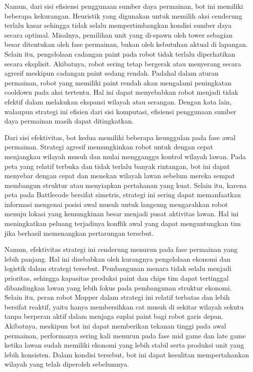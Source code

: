 \documentclass{article}
\begin{document}
Namun, dari sisi efisiensi penggunaan sumber daya permainan, bot ini memiliki beberapa kekurangan. 
Heuristik yang digunakan untuk memilih aksi cenderung terlalu kasar sehingga tidak selalu 
mempertimbangkan kondisi sumber daya secara optimal. Misalnya, pemilihan unit yang di-spawn oleh 
tower sebagian besar ditentukan oleh fase permainan, bukan oleh kebutuhan aktual di lapangan. Selain 
itu, pengelolaan cadangan paint pada robot tidak terlalu diperhatikan secara eksplisit. Akibatnya, robot 
sering tetap bergerak atau menyerang secara agresif meskipun cadangan paint sedang rendah. Padahal 
dalam aturan permainan, robot yang memiliki paint rendah akan mengalami peningkatan cooldown pada aksi tertentu. Hal ini dapat menyebabkan robot menjadi tidak efektif dalam melakukan ekspansi wilayah 
atau serangan. Dengan kata lain, walaupun strategi ini efisien dari sisi komputasi, efisiensi penggunaan 
sumber daya permainan masih dapat ditingkatkan.

Dari sisi efektivitas, bot kedua memiliki beberapa keunggulan pada fase awal permainan. Strategi agresif 
memungkinkan robot untuk dengan cepat menjangkau wilayah musuh dan mulai mengganggu kontrol 
wilayah lawan. Pada peta yang relatif terbuka dan tidak terlalu banyak rintangan, bot ini dapat menyebar 
dengan cepat dan menekan wilayah lawan sebelum mereka sempat membangun struktur atau menyiapkan 
pertahanan yang kuat. Selain itu, karena peta pada Battlecode bersifat simetris, strategi ini sering dapat 
memanfaatkan informasi mengenai posisi awal musuh untuk langsung mengarahkan robot menuju lokasi 
yang kemungkinan besar menjadi pusat aktivitas lawan. Hal ini meningkatkan peluang terjadinya konflik 
awal yang dapat menguntungkan tim jika berhasil memenangkan pertarungan tersebut.

Namun, efektivitas strategi ini cenderung menurun pada fase permainan yang lebih panjang. Hal ini 
disebabkan oleh kurangnya pengelolaan ekonomi dan logistik dalam strategi tersebut. Pembangunan 
menara tidak selalu menjadi prioritas, sehingga kapasitas produksi paint dan chips tim dapat tertinggal 
dibandingkan lawan yang lebih fokus pada pembangunan struktur ekonomi. Selain itu, peran robot 
Mopper dalam strategi ini relatif terbatas dan lebih bersifat reaktif, yaitu hanya membersihkan cat musuh 
di sekitar wilayah sekutu tanpa berperan aktif dalam menjaga suplai paint bagi robot garis depan. 
Akibatnya, meskipun bot ini dapat memberikan tekanan tinggi pada awal permainan, performanya sering 
kali menurun pada fase mid game dan late game ketika lawan sudah memiliki ekonomi yang lebih stabil 
serta produksi unit yang lebih konsisten. Dalam kondisi tersebut, bot ini dapat kesulitan mempertahankan 
wilayah yang telah diperoleh sebelumnya.
\end{document}
